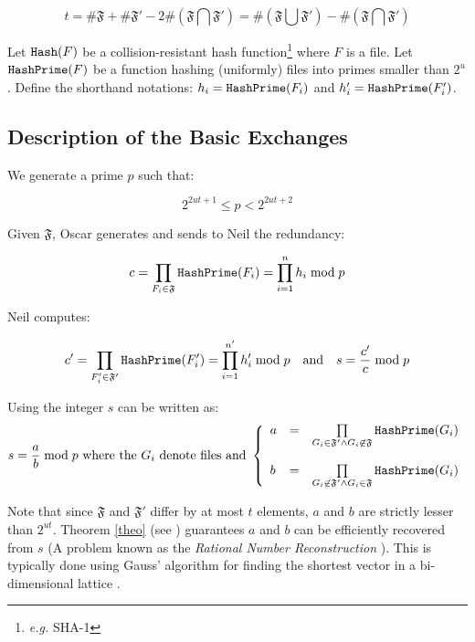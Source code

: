 \documentclass[11pt]{llncs}
\begin{document}
$$t=\#\mathfrak{F}+\#\mathfrak{F}'-2 \#\left(\mathfrak{F} \bigcap \mathfrak{F}'\right)=\#\left(\mathfrak{F}\bigcup\mathfrak{F}'\right)-\#\left(\mathfrak{F}\bigcap\mathfrak{F}'\right)$$

Let $\mbox{{\tt Hash}}(F)$ be a collision-resistant hash function\footnote{{\sl e.g.} SHA-1} where $F$ is a file. Let $\mbox{{\tt HashPrime}}(F)$ be a function hashing (uniformly) files into primes smaller than $2^u$. Define the shorthand notations: $h_i=\mbox{{\tt HashPrime}}(F_i)$ and $h'_i=\mbox{{\tt HashPrime}}(F'_i)$.\smallskip

\subsection{Description of the Basic Exchanges}
\label{basic}

We generate a prime $p$ such that:

\begin{equation}
\label{equp}
2^{2ut+1} \leq p < 2^{2ut+2}
\end{equation}

Given $\mathfrak{F}$, Oscar generates and sends to Neil the redundancy:

$$
c=\prod_{F_i\in \mathfrak{F}} \mbox{{\tt HashPrime}}(F_i)=\prod_{i=1}^n h_i \bmod p
$$

Neil computes:\smallskip

$$c'=\prod_{F'_i\in \mathfrak{F'}} \mbox{{\tt HashPrime}}(F'_i)=\prod_{i=1}^{n'} h'_i \bmod p{~~~\mbox{and}~~~}s=\frac{c'}{c} \bmod p$$

Using \cite{vallee} the integer $s$ can be written as:
$$s=\frac{a}{b} \bmod p{\mbox{~where the~}G_i\mbox{~denote files and~}}
\left\{
\begin{array}{lcr}
a & =&  \prod\limits_{G_i \in \mathfrak{F}'\wedge G_i \not\in\mathfrak{F}} \mbox{{\tt HashPrime}}(G_i) \\
\\
b & = & \prod\limits_{G_i \not\in\mathfrak{F}' \wedge G_i \in\mathfrak{F}} \mbox{{\tt HashPrime}}(G_i)
\end{array}
\right.
$$

Note that since $\mathfrak{F}$ and $\mathfrak{F}'$ differ by at most $t$ elements, $a$ and $b$ are strictly lesser than $2^{ut}$. Theorem \ref{theo} (see \cite{cryptorational}) guarantees $a$ and $b$ can be efficiently recovered from $s$ (A problem  known as the {\sl Rational Number Reconstruction} \cite{pan2004rational,wang2003acceleration}). This is typically done using Gauss' algorithm for finding the shortest vector in a bi-dimensional lattice \cite{vallee}.
\end{document}
